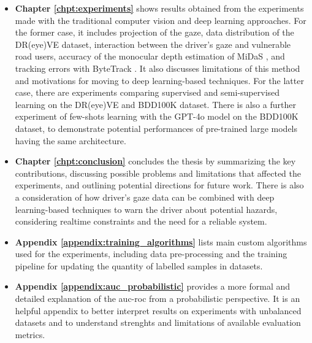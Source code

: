 \begin{itemize}
    \item \textbf{Chapter \ref{chpt:experiments}} shows results obtained from 
    the experiments made with the traditional computer vision and deep learning 
    approaches. For the former case, it includes projection of the gaze, 
    data distribution of the DR(eye)VE dataset, interaction between the 
    driver's gaze and vulnerable road users, accuracy of the monocular depth 
    estimation of MiDaS \cite{midas}, and tracking errors with ByteTrack \cite{bytetrack}. 
    It also discusses limitations of this method 
    and motivations for moving to deep learning-based techniques.
    For the latter case, there are experiments comparing supervised and 
    semi-supervised learning on the DR(eye)VE and BDD100K dataset. There is also 
    a further experiment of few-shots learning with the GPT-4o model on the 
    BDD100K dataset, to demonstrate potential performances of pre-trained large 
    models having the same architecture.

    \item \textbf{Chapter \ref{chpt:conclusion}} concludes the thesis by summarizing 
    the key contributions, discussing possible problems and limitations that 
    affected the experiments, and outlining potential directions for future work.
    There is also a consideration of how driver's gaze data can be combined with 
    deep learning-based techniques to warn the driver about potential hazards, 
    considering realtime constraints and the need for a reliable system.
    \item \textbf{Appendix \ref{appendix:training_algorithms}} lists main custom 
    algorithms used for the experiments, including data pre-processing and the 
    training pipeline for updating the quantity of labelled samples in datasets.
    \item \textbf{Appendix \ref{appendix:auc_probabilistic}} provides a more 
    formal and detailed explanation of the \acs{auc}-\acs{roc} from a probabilistic
    perspective. It is an helpful appendix to better interpret results on 
    experiments with unbalanced datasets and to understand strenghts and 
    limitations of available evaluation metrics.
\end{itemize}
